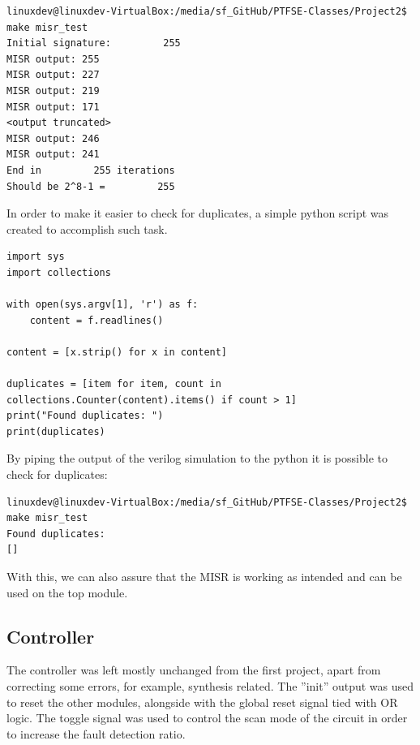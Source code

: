\documentclass[12pt]{article}
\begin{document}
    \begin{lstlisting}[caption={MISR test-bench.},captionpos=b]
linuxdev@linuxdev-VirtualBox:/media/sf_GitHub/PTFSE-Classes/Project2$ make misr_test
Initial signature:         255
MISR output: 255
MISR output: 227
MISR output: 219
MISR output: 171
<output truncated>
MISR output: 246
MISR output: 241
End in         255 iterations
Should be 2^8-1 =         255
    \end{lstlisting}    
    
In order to make it easier to check for duplicates, a simple python script was created to accomplish such task. 

    \begin{lstlisting}[caption={Python code that detects duplicates.},captionpos=b]
import sys
import collections

with open(sys.argv[1], 'r') as f:
    content = f.readlines()

content = [x.strip() for x in content] 

duplicates = [item for item, count in collections.Counter(content).items() if count > 1]
print("Found duplicates: ")
print(duplicates)

    \end{lstlisting}   

By piping the output of the verilog simulation to the python it is possible to check for duplicates:

    \begin{lstlisting}[caption={Python script output.},captionpos=b]
linuxdev@linuxdev-VirtualBox:/media/sf_GitHub/PTFSE-Classes/Project2$ make misr_test
Found duplicates: 
[]
    \end{lstlisting}    
    
    With this, we can also assure that the MISR is working as intended and can be used on the top module.\\

    
    \subsection*{Controller}
    
    The controller was left mostly unchanged from the first project, apart from correcting some errors, for example, synthesis related. The ''init'' output was used to reset the other modules, alongside with the global reset signal tied with OR logic. The toggle signal was used to control the scan mode of the circuit in order to increase the fault detection ratio.
    
\end{document}
